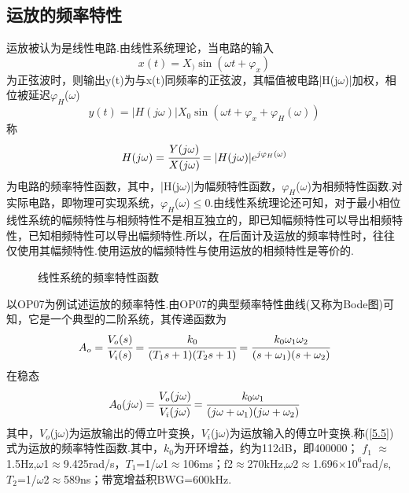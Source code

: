 \documentclass[a4paper]{article}
\begin{document}
\subsection{运放的频率特性}
运放被认为是线性电路.由线性系统理论，当电路的输入
\begin{equation}
x(t) = X_)\sin(\omega t+\varphi_x)\label{5.1}
\end{equation}
为正弦波时，则输出y(t)为与x(t)同频率的正弦波，其幅值被电路|H(j$\omega$)|加权，相位被延迟$\varphi_H$($\omega$)
\begin{equation}
y(t) = |H(j\omega)|X_0\sin\left(\omega t+\varphi_x+\varphi_H(\omega)\right)\label{5.2}
\end{equation}
称
\begin{equation}
H(j\omega) = \cfrac{Y(j\omega)}{X(j\omega)} = |H(j\omega)|e^{j\varphi_H(\omega)}\label{5.3}
\end{equation}
为电路的频率特性函数，其中，|H(j$\omega$)|为幅频特性函数，$\varphi_H$($\omega$)为相频特性函数.对实际电路，即物理可实现系统，$\varphi_H$($\omega$)$\leq$0.由线性系统理论还可知，对于最小相位线性系统的幅频特性与相频特性不是相互独立的，即已知幅频特性可以导出相频特性，已知相频特性可以导出幅频特性.所以，在后面计及运放的频率特性时，往往仅使用其幅频特性.使用运放的幅频特性与使用运放的相频特性是等价的.
\begin{figure}[!h]
\centering
{}
\caption{线性系统的频率特性函数}\label{freqFuncLinSys}
\end{figure}
以OP07为例试述运放的频率特性.由OP07的典型频率特性曲线(又称为Bode图)可知，它是一个典型的二阶系统，其传递函数为
\begin{equation}
A_o = \cfrac{V_o(s)}{V_i(s)} = \cfrac{k_0}{(T_1s+1)(T_2s+1)} = \cfrac{k_0\omega_1\omega_2}{(s+\omega_1)(s+\omega_2)}\label{5.4}
\end{equation}
在稳态
\begin{equation}
A_0(j\omega) = \cfrac{V_o(j\omega)}{V_i(j\omega)} = \cfrac{k_0\omega_1}{(j\omega+\omega_1)(j\omega+\omega_2)}\label{5.5}
\end{equation}
其中，$V_o$(j$\omega$)为运放输出的傅立叶变换，$V_i$(j$\omega$)为运放输入的傅立叶变换.称(\ref{5.5})式为运放的频率特性函数.其中，$k_0$为开环增益，约为112dB，即400000； $f_1$ $\approx$1.5Hz,$\omega$1$\approx$9.425rad/s，$T_1$=1/$\omega$1$\approx$106ms；f2$\approx$270kHz,$\omega$2$\approx$1.696$\times 10^6$rad/s, $T_2$=1/$\omega$2$\approx$589ns；带宽增益积BWG=600kHz.
\end{document}
